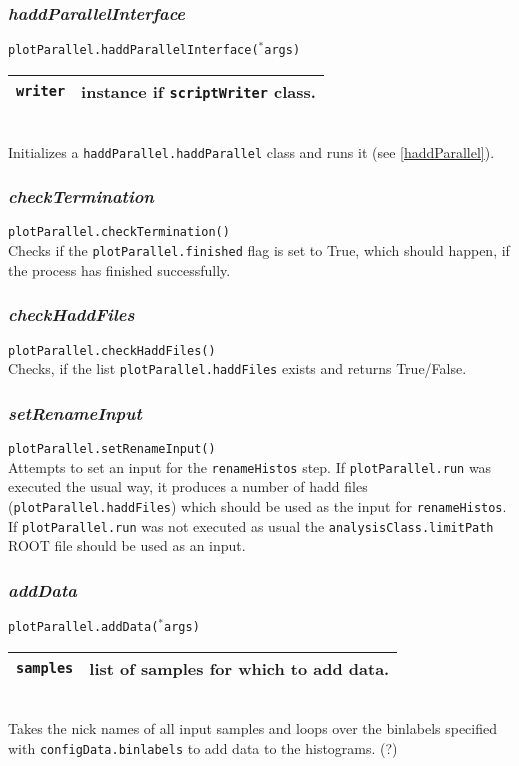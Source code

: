 \documentclass[12pt, a4paper]{article}
\newcommand{\args}{$^*$args}
\begin{document}
\subsubsection{\textit{haddParallelInterface}}
\texttt{plotParallel.haddParallelInterface(\args)}\\
\begin{tabular}{r|l}
\hline
\texttt{writer}	& instance if \texttt{scriptWriter} class.\\
\hline
\end{tabular}
\\
Initializes a \texttt{haddParallel.haddParallel} class and runs it (see \ref{haddParallel}). 



\subsubsection{\textit{checkTermination}}
\texttt{plotParallel.checkTermination()}\\
Checks if the \texttt{plotParallel.finished} flag is set to True, which should happen, if the process has finished successfully.

\subsubsection{\textit{checkHaddFiles}}
\texttt{plotParallel.checkHaddFiles()}\\
Checks, if the list \texttt{plotParallel.haddFiles} exists and returns True/False.

\subsubsection{\textit{setRenameInput}}
\texttt{plotParallel.setRenameInput()}\\
Attempts to set an input for the \texttt{renameHistos} step. If \texttt{plotParallel.run} was executed the usual way, it produces a number of hadd files (\texttt{plotParallel.haddFiles}) which should be used as the input for \texttt{renameHistos}.\\
If \texttt{plotParallel.run} was not executed as usual the \texttt{analysisClass.limitPath} ROOT file should be used as an input.


\subsubsection{\textit{addData}}
\texttt{plotParallel.addData(\args)}\\
\begin{tabular}{r|l}
\hline
\texttt{samples}	&	list of samples for which to add data.\\
\hline
\end{tabular}
\\
Takes the nick names of all input samples and loops over the binlabels specified with \texttt{configData.binlabels} to add data to the histograms. (?)
\end{document}
